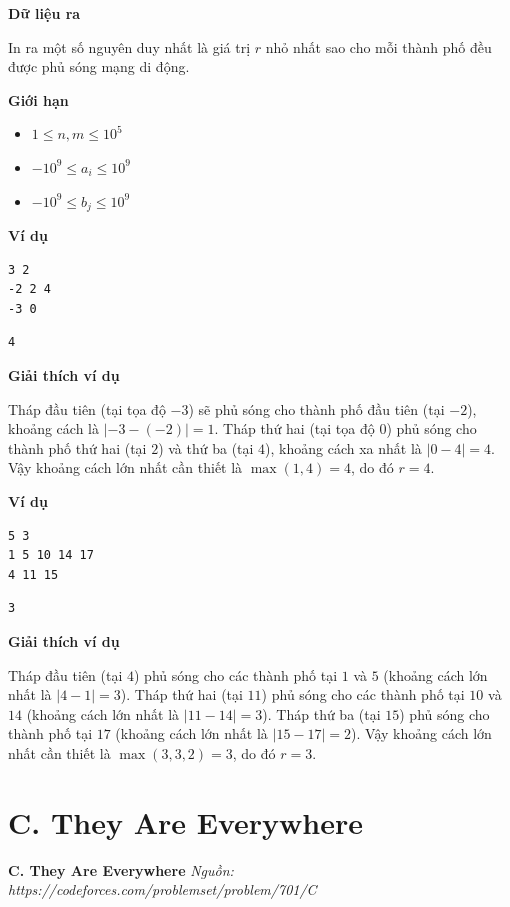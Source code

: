 \documentclass[12pt,a4paper]{article}
\newcommand{\problem}[2]{%
  \begin{mdframed}[
    linecolor=framecolor,
    linewidth=1.5pt,
    backgroundcolor=white,
    topline=true, bottomline=true,
    leftline=true, rightline=true,
    innerleftmargin=10pt, innerrightmargin=10pt,
    innertopmargin=6pt, innerbottommargin=6pt,
  ]
  \textbf{\large #1} \hfill \textit{Nguồn: #2}
  \end{mdframed}
  \vspace{4pt}%
}
\newcommand{\outputformat}{%
  \vspace{6pt}\textbf{\textcolor{sectioncolor}{Dữ liệu ra}}\par\vspace{2pt}%
}
\newcommand{\constraints}{%
  \vspace{6pt}\textbf{\textcolor{sectioncolor}{Giới hạn}}\par\vspace{2pt}%
}
\newcommand{\example}{%
  \vspace{6pt}\textbf{\textcolor{sectioncolor}{Ví dụ}}\par\vspace{2pt}%
}
\newcommand{\explanation}{%
  \vspace{6pt}\textbf{\textcolor{sectioncolor}{Giải thích ví dụ}}\par\vspace{2pt}%
}
\begin{document}
\outputformat
\begin{outputbox}
In ra một số nguyên duy nhất là giá trị $r$ nhỏ nhất sao cho mỗi thành phố đều được phủ sóng mạng di động.
\end{outputbox}

\constraints
\begin{constraintbox}
\begin{itemize}
    \item $1 \le n, m \le 10^5$
    \item $-10^9 \le a_i \le 10^9$
    \item $-10^9 \le b_j \le 10^9$
\end{itemize}
\end{constraintbox}

\example
\begin{lstlisting}
3 2
-2 2 4
-3 0
\end{lstlisting}

\begin{lstlisting}
4
\end{lstlisting}

\explanation
Tháp đầu tiên (tại tọa độ $-3$) sẽ phủ sóng cho thành phố đầu tiên (tại $-2$), khoảng cách là $|-3 - (-2)| = 1$. Tháp thứ hai (tại tọa độ $0$) phủ sóng cho thành phố thứ hai (tại $2$) và thứ ba (tại $4$), khoảng cách xa nhất là $|0 - 4| = 4$. Vậy khoảng cách lớn nhất cần thiết là $\max(1, 4) = 4$, do đó $r = 4$.

\example
\begin{lstlisting}
5 3
1 5 10 14 17
4 11 15
\end{lstlisting}

\begin{lstlisting}
3
\end{lstlisting}

\explanation
Tháp đầu tiên (tại $4$) phủ sóng cho các thành phố tại $1$ và $5$ (khoảng cách lớn nhất là $|4 - 1| = 3$). Tháp thứ hai (tại $11$) phủ sóng cho các thành phố tại $10$ và $14$ (khoảng cách lớn nhất là $|11 - 14| = 3$). Tháp thứ ba (tại $15$) phủ sóng cho thành phố tại $17$ (khoảng cách lớn nhất là $|15 - 17| = 2$). Vậy khoảng cách lớn nhất cần thiết là $\max(3, 3, 2) = 3$, do đó $r = 3$.


\section{C. They Are Everywhere}
\problem{C. They Are Everywhere}{https://codeforces.com/problemset/problem/701/C}
\end{document}
